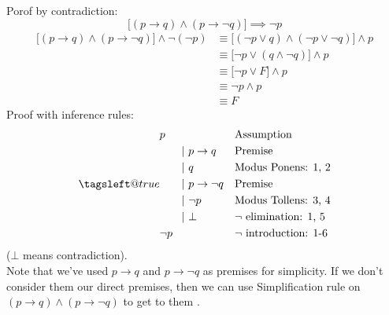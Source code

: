 \documentclass[11pt]{article}
\makeatletter
\newcommand{\leqnomode}{\tagsleft@true}
\newcommand{\tab}[1][30pt]{\hspace*{#1}}
\newcommand{\subrule}{\tab[20pt]\vert\ }
\makeatother
\begin{document}
\subsubsection{}
Porof by contradiction:
\begin{equation}
\biggl[(p\to q) \land (p \to \neg q)\biggr] \implies \neg p
\end{equation}
\begin{align*}
\biggl[(p\to q) \land (p \to \neg q)\biggr] \land \neg(\neg p) &\equiv \biggl[(\neg p \lor q) \land (\neg p \lor \neg q)\biggr] \land p\\
& \equiv \biggl[\neg p \lor (q \land \neg q)\biggr] \land p\\
& \equiv \biggl[\neg p \lor F\biggr] \land p\\
& \equiv \neg p \land p\\
& \equiv F \tag*{$\therefore$ Contradiction}
\end{align*}
Proof with inference rules:
\begin{subequations}
\leqnomode
\renewcommand{\theequation}{\arabic{equation}}
\begin{align}
&p&&\textup{Assumption}\\
&\subrule p\to q &&\textup{Premise}\\
&\subrule  q && \textup{Modus Ponens: 1, 2}\\
&\subrule p \to \neg q&&\textup{Premise}\\
&\subrule \neg p &&\textup{Modus Tollens: 3, 4}\\
&\subrule  \bot &&\textup{$\neg$ elimination: 1, 5}\\
&\neg p &&\textup{$\neg$ introduction: 1-6}
\end{align}
\end{subequations}
(\(\bot\) means contradiction).\\
Note that we've used \(p\to q\) and \(p\to \neg q\) as premises for simplicity.
If we don't consider them our direct premises, then we can use Simplification rule on \((p\to q) \land (p\to \neg q)\) to get to them .
\end{document}
